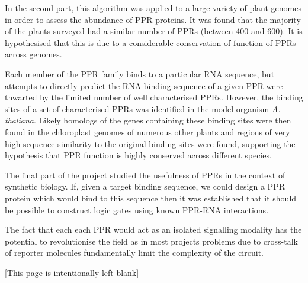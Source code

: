 \documentclass[11pt,a4paper, wide, twoside]{IIBproject}
\newcommand{\blankpage}{
  \newpage
  \thispagestyle{empty}
  \vspace*{\fill}
  \begin{center} 
    [This page is intentionally left blank]
  \end{center}
  \newpage
}
\begin{document}
{In the second part, this algorithm was applied to a large variety of plant 
genomes in order to assess the abundance of PPR proteins.
It was found that the majority of the plants surveyed had a similar number of
PPRs (between 400 and 600).
It is hypothesised that this is due to a considerable conservation of function
of PPRs across genomes.

Each member of the PPR family binds to a particular RNA sequence, but
attempts to directly predict the RNA binding sequence of a given PPR 
were thwarted by the limited number of well characterised PPRs.
However, the binding sites of a set of characterised PPRs was identified in 
the model organism \emph{A. thaliana}.
Likely homologs of the genes containing these binding sites were then found in
the chloroplast genomes of numerous other plants and regions of very high
sequence similarity to the original binding sites were found, supporting the
hypothesis that PPR function is highly conserved across different species.

The final part of the project studied the usefulness of PPRs in the context of
synthetic biology.
If, given a target binding sequence, we could design a PPR protein which would
bind to this sequence then it was established that it should be possible to 
construct logic gates using known PPR-RNA interactions.

The fact that each each PPR would act as an isolated signalling modality has
the potential to revolutionise the field as in most projects problems due to
cross-talk of reporter molecules fundamentally limit the complexity of the
circuit.

}

\clearpage %


\setcounter{tocdepth}{1}
\tableofcontents %

\clearpage %
\blankpage


\pagestyle{mainstyle}

\end{document}
